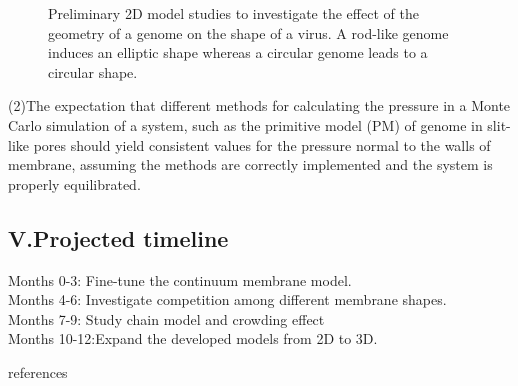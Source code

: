 \documentclass[12pt]{article}
\begin{document}
\begin{flushleft}
\begin{figure}[!ht]
  \centering
  \caption{Preliminary 2D model studies to
investigate the effect of the geometry of a
genome on the shape of a virus. A rod-like
genome induces an elliptic shape whereas a
circular genome leads to a circular shape.}
\end{figure}

(2)The expectation that different methods for calculating the pressure in a Monte Carlo simulation of a system, such as the primitive model (PM) of genome in slit-like pores should yield consistent values for the pressure normal to the walls of membrane, assuming the methods are correctly implemented and the system is properly equilibrated.

\subsection*{V.Projected timeline}

Months 0-3: Fine-tune the continuum membrane model.\\
Months 4-6: Investigate competition among different membrane shapes.\\
Months 7-9: Study chain model and crowding effect\\
Months 10-12:Expand the developed models from 2D to 3D.\\


\newpage

\end{flushleft}

 {references}  
\end{document}
